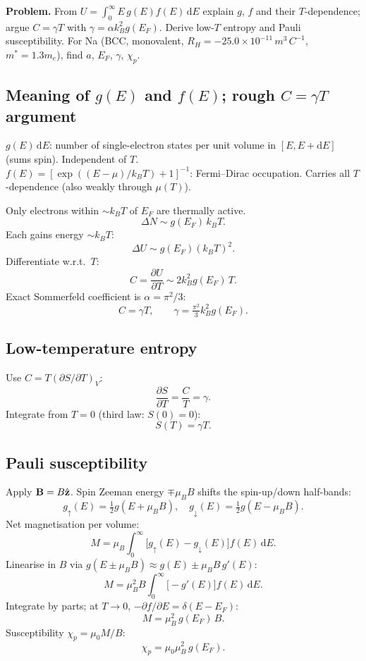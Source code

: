 \documentclass[11pt]{article}
\newcommand{\de}{\mathrm{d}}
\newcommand{\pd}[2]{\frac{\partial #1}{\partial #2}}
\begin{document}
\textbf{Problem.} From $U=\int_{0}^{\infty}E\,g(E)f(E)\,\de E$ explain $g$, $f$ and their $T$-dependence; argue $C=\gamma T$ with $\gamma=\alpha k_{B}^{2}g(E_{F})$. Derive low-$T$ entropy and Pauli susceptibility. For Na (BCC, monovalent, $R_{H}=-25.0\times 10^{-11}\,\si{m^{3}\,C^{-1}}$, $m^{*}=1.3 m_{e}$), find $a$, $E_{F}$, $\gamma$, $\chi_{p}$.

\subsection*{Meaning of $g(E)$ and $f(E)$; rough $C=\gamma T$ argument}

$g(E)\,\de E$: number of single-electron states per unit volume in $[E,E+\de E]$ (sums spin). Independent of $T$.\\
$f(E)=[\exp((E-\mu)/k_{B}T)+1]^{-1}$: Fermi--Dirac occupation. Carries all $T$-dependence (also weakly through $\mu(T)$).

Only electrons within $\sim k_{B}T$ of $E_{F}$ are thermally active.
\[ \Delta N \sim g(E_{F})\,k_{B}T. \]
Each gains energy $\sim k_{B}T$:
\[ \Delta U \sim g(E_{F})(k_{B}T)^{2}. \]
Differentiate w.r.t.\ $T$:
\[ C = \pd{U}{T} \sim 2 k_{B}^{2}g(E_{F})\,T. \]
Exact Sommerfeld coefficient is $\alpha=\pi^{2}/3$:
\[ \boxed{\;C = \gamma T,\qquad \gamma = \tfrac{\pi^{2}}{3}k_{B}^{2}g(E_{F}).\;}\label{eq:gamma} \]

\subsection*{Low-temperature entropy}

Use $C=T(\partial S/\partial T)_{V}$:
\[ \pd{S}{T} = \frac{C}{T} = \gamma. \]
Integrate from $T=0$ (third law: $S(0)=0$):
\[ \boxed{\;S(T) = \gamma T.\;} \]

\subsection*{Pauli susceptibility}

Apply $\vb B = B\hat{\vb z}$. Spin Zeeman energy $\mp \mu_{B}B$ shifts the spin-up/down half-bands:
\[ g_{\uparrow}(E)=\tfrac12 g(E+\mu_{B}B),\quad g_{\downarrow}(E)=\tfrac12 g(E-\mu_{B}B). \]
Net magnetisation per volume:
\[ M = \mu_{B}\!\int_{0}^{\infty}\!\bigl[g_{\uparrow}(E)-g_{\downarrow}(E)\bigr]f(E)\,\de E. \]
Linearise in $B$ via $g(E\pm\mu_{B}B)\approx g(E)\pm\mu_{B}B\,g'(E)$:
\[ M = \mu_{B}^{2}B\!\int_{0}^{\infty}\!\bigl[-g'(E)\bigr]f(E)\,\de E. \]
Integrate by parts; at $T\to 0$, $-\partial f/\partial E = \delta(E-E_{F})$:
\[ M = \mu_{B}^{2}\,g(E_{F})\,B. \]
Susceptibility $\chi_{p}=\mu_{0}M/B$:
\[ \boxed{\;\chi_{p}=\mu_{0}\mu_{B}^{2}\,g(E_{F}).\;}\label{eq:chip} \]
\end{document}
